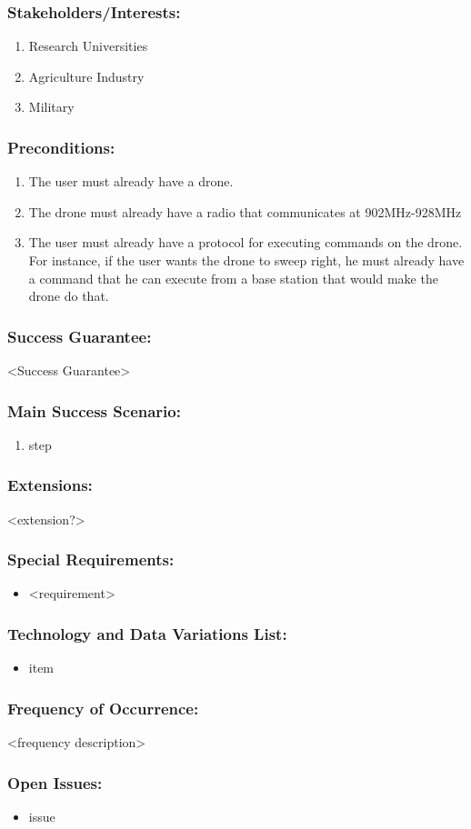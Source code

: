 \documentclass[ProductRequirements.tex]{subfiles}
\begin{document}
	\subsubsection*{Stakeholders/Interests:}
	\begin{enumerate}\itemsep1pt
		\item Research Universities
		\item Agriculture Industry
		\item Military
	\end{enumerate}
	\subsubsection*{Preconditions:}
	\begin{enumerate}\itemsep1pt
		\item The user must already have a drone.
		\item The drone must already have a radio that communicates at 902MHz-928MHz
		\item The user must already have a protocol for executing commands on the drone. For instance, if the user wants the drone to sweep right, he must already have a command that he can execute from a base station that would make the drone do that.
	\end{enumerate}
	\subsubsection*{Success Guarantee:}
	<Success Guarantee>
	\subsubsection*{Main Success Scenario:}
	\begin{enumerate}\itemsep1pt
		\item step
	\end{enumerate}
	\subsubsection*{Extensions:}
	<extension?>
	\subsubsection*{Special Requirements:}
	\begin{itemize}\itemsep1pt
		\item <requirement>
	\end{itemize}
	\subsubsection*{Technology and Data Variations List:}
	\begin{itemize}\itemsep1pt
		\item item
	\end{itemize}
	\subsubsection*{Frequency of Occurrence:}
	<frequency description>
	\subsubsection*{Open Issues:}
	\begin{itemize}\itemsep1pt
		\item issue
	\end{itemize}
		
\end{document}
